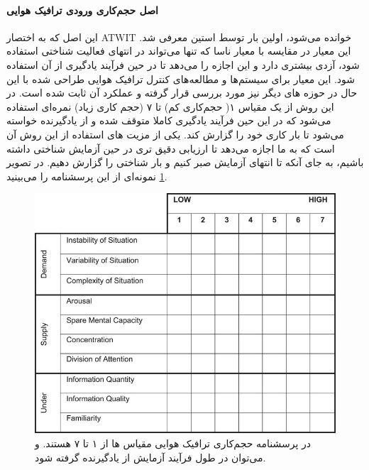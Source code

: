 \paragraph{اصل حجم‌کاری ورودی ترافیک هوایی}
این اصل که به اختصار 
ATWIT
خوانده می‌شود، اولین بار توسط استین معرفی شد.
\cite{stein1985air}
این معیار در مقایسه با معیار ناسا که تنها می‌تواند در انتهای فعالیت شناختی استفاده شود، آزدی بیشتری دارد و این اجازه را می‌دهد تا در حین فرآیند یادگیری از آن استفاده شود. این معیار برای سیستم‌ها و مطالعه‌های کنترل ترافیک هوایی طراحی شده با این حال در حوزه های دیگر نیز مورد بررسی قرار گرفته و عملکرد آن ثابت شده است. در این روش از یک مقیاس ۱( حجم‌کاری کم) تا ۷ (حجم کاری زیاد) نمره‌ای استفاده می‌شود که در این حین فرآیند یادگیری کاملا متوقف شده و از یادگیرنده خواسته می‌شود تا بار کاری خود را گزارش کند. یکی از مزیت های استفاده از این روش آن است که به ما اجازه می‌دهد تا ارزیابی دقیق تری در حین آزمایش شناختی داشته باشیم، به جای آنکه تا انتهای آزمایش صبر کنیم و بار شناختی را گزارش دهیم. در تصویر
\ref{fig:atwit}
نمونه‌ای از این پرسشنامه را می‌بینید.

\begin{figure}[htbp]
	\centering
	\includegraphics[width=0.7\linewidth]{figures/ATWIT}
	\caption[پرسش نامه‌ی ترافیک‌هوایی]{در پرسشنامه حجم‌کاری ترافیک هوایی مقیاس ها از ۱ تا ۷ هستند. و می‌توان در طول فرآیند آزمایش از یادگیرنده گرفته شود.}
	\label{fig:atwit}
\end{figure}

